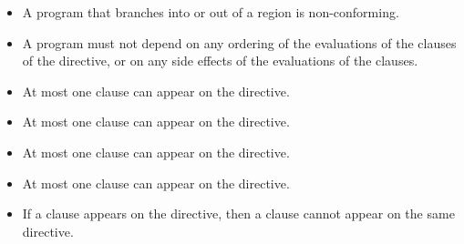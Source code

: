 \begin{itemize}
\item A program that branches into or out of a  region is non-conforming.

\item A program must not depend on any ordering of the evaluations of the clauses of the
 directive, or on any side effects of the evaluations of the clauses.

\item At most one  clause can appear on the directive.

\item At most one  clause can appear on the directive.

\item At most one  clause can appear on the directive.

\item At most one  clause can appear on the directive.

\item If a  clause appears on the directive, then a  clause cannot appear on the same directive.


\end{itemize}

